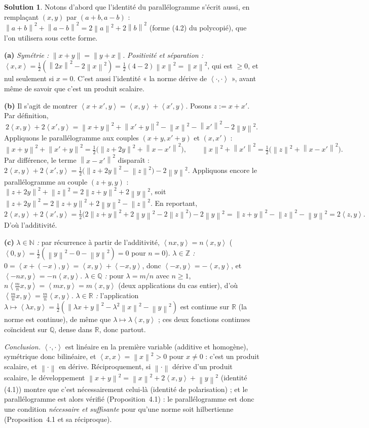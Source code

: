 \documentclass[11pt,a4paper]{article}
\newcommand{\R}{\mathbb{R}}
\newcommand{\N}{\mathbb{N}}
\newcommand{\Z}{\mathbb{Z}}
\newcommand{\Q}{\mathbb{Q}}
\newcommand{\norm}[1]{\left\|#1\right\|}
\newcommand{\ps}[2]{\left\langle #1,#2\right\rangle}
\theoremstyle{definition}
\newtheorem*{solution}{Solution}
\begin{document}
\begin{solution}
Notons d'abord que l'identité du parallélogramme s'écrit aussi, en remplaçant $(x,y)$ par $(a+b,a-b)$ : $\norm{a+b}^2+\norm{a-b}^2=2\norm a^2+2\norm b^2$ (forme (4.2) du polycopié), que l'on utilisera sous cette forme.

\medskip
\noindent\textbf{(a)} \emph{Symétrie :} $\norm{x+y}=\norm{y+x}$. \emph{Positivité et séparation :} $\ps xx=\frac12(\norm{2x}^2-2\norm x^2)=\frac12(4-2)\norm x^2=\norm x^2$, qui est $\ge0$, et nul seulement si $x=0$. C'est aussi l'identité « la norme dérive de $\ps\cdot\cdot$ », avant même de savoir que c'est un produit scalaire.

\medskip
\noindent\textbf{(b)} Il s'agit de montrer $\ps{x+x'}y=\ps xy+\ps{x'}y$. Posons $z:=x+x'$. Par définition,
\[
2\ps xy+2\ps{x'}y=\norm{x+y}^2+\norm{x'+y}^2-\norm x^2-\norm{x'}^2-2\norm y^2 .
\]
Appliquons le parallélogramme aux couples $(x+y,x'+y)$ et $(x,x')$ :
\[
\norm{x+y}^2+\norm{x'+y}^2=\tfrac12\big(\norm{z+2y}^2+\norm{x-x'}^2\big),\qquad
\norm x^2+\norm{x'}^2=\tfrac12\big(\norm z^2+\norm{x-x'}^2\big).
\]
Par différence, le terme $\norm{x-x'}^2$ disparaît : $2\ps xy+2\ps{x'}y=\frac12\big(\norm{z+2y}^2-\norm z^2\big)-2\norm y^2$. Appliquons encore le parallélogramme au couple $(z+y,y)$ : $\norm{z+2y}^2+\norm z^2=2\norm{z+y}^2+2\norm y^2$, soit $\norm{z+2y}^2=2\norm{z+y}^2+2\norm y^2-\norm z^2$. En reportant,
\[
2\ps xy+2\ps{x'}y=\tfrac12\big(2\norm{z+y}^2+2\norm y^2-2\norm z^2\big)-2\norm y^2=\norm{z+y}^2-\norm z^2-\norm y^2=2\ps zy .
\]
D'où l'additivité.

\medskip
\noindent\textbf{(c)} \emph{$\lambda\in\N$ :} par récurrence à partir de l'additivité, $\ps{nx}y=n\ps xy$ ($\ps{0}y=\frac12(\norm y^2-0-\norm y^2)=0$ pour $n=0$). \emph{$\lambda\in\Z$ :} $0=\ps{x+(-x)}y=\ps xy+\ps{-x}y$, donc $\ps{-x}y=-\ps xy$, et $\ps{-nx}y=-n\ps xy$. \emph{$\lambda\in\Q$ :} pour $\lambda=m/n$ avec $n\ge1$, $n\ps{\frac mnx}y=\ps{mx}y=m\ps xy$ (deux applications du cas entier), d'où $\ps{\frac mnx}y=\frac mn\ps xy$. \emph{$\lambda\in\R$ :} l'application $\lambda\mapsto\ps{\lambda x}y=\frac12(\norm{\lambda x+y}^2-\lambda^2\norm x^2-\norm y^2)$ est continue sur $\R$ (la norme est continue), de même que $\lambda\mapsto\lambda\ps xy$ ; ces deux fonctions continues coïncident sur $\Q$, dense dans $\R$, donc partout.

\emph{Conclusion.} $\ps\cdot\cdot$ est linéaire en la première variable (additive et homogène), symétrique donc bilinéaire, et $\ps xx=\norm x^2>0$ pour $x\ne0$ : c'est un produit scalaire, et $\norm\cdot$ en dérive. Réciproquement, si $\norm\cdot$ dérive d'un produit scalaire, le développement $\norm{x+y}^2=\norm x^2+2\ps xy+\norm y^2$ (identité (4.1)) montre que c'est nécessairement celui-là (identité de polarisation) ; et le parallélogramme est alors vérifié (Proposition~4.1) : le parallélogramme est donc une condition \emph{nécessaire et suffisante} pour qu'une norme soit hilbertienne (Proposition~4.1 et sa réciproque).
\end{solution}
\end{document}
